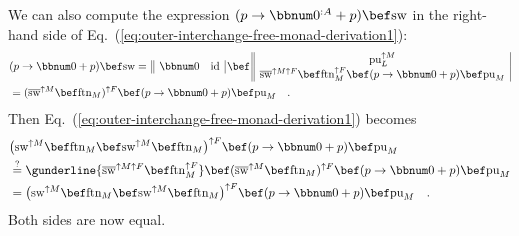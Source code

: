 We can also compute the expression $(p\rightarrow\bbnum 0^{:A}+p)\bef\text{sw}$
in the right-hand side of Eq.~(\ref{eq:outer-interchange-free-monad-derivation1}):
\begin{align*}
 & (p\rightarrow\bbnum 0+p)\bef\text{sw}=\,\begin{array}{||cc|}
\bbnum 0 & \text{id}\end{array}\,\bef\,\begin{array}{||c|}
\text{pu}_{L}^{\uparrow M}\\
\overline{\text{sw}}^{\uparrow M\uparrow F}\bef\text{ftn}_{M}^{\uparrow F}\bef(p\rightarrow\bbnum 0+p)\bef\text{pu}_{M}
\end{array}\\
 & =(\overline{\text{sw}}^{\uparrow M}\bef\text{ftn}_{M})^{\uparrow F}\bef(p\rightarrow\bbnum 0+p)\bef\text{pu}_{M}\quad.
\end{align*}
Then Eq.~(\ref{eq:outer-interchange-free-monad-derivation1}) becomes
\begin{align*}
 & \big(\text{sw}^{\uparrow M}\bef\text{ftn}_{M}\bef\text{sw}^{\uparrow M}\bef\text{ftn}_{M}\big)^{\uparrow F}\bef(p\rightarrow\bbnum 0+p)\bef\text{pu}_{M}\\
 & \overset{?}{=}\gunderline{\overline{\text{sw}}^{\uparrow M\uparrow F}\bef\text{ftn}_{M}^{\uparrow F}}\bef(\overline{\text{sw}}^{\uparrow M}\bef\text{ftn}_{M})^{\uparrow F}\bef(p\rightarrow\bbnum 0+p)\bef\text{pu}_{M}\\
 & =\big(\text{sw}^{\uparrow M}\bef\text{ftn}_{M}\bef\text{sw}^{\uparrow M}\bef\text{ftn}_{M}\big)^{\uparrow F}\bef(p\rightarrow\bbnum 0+p)\bef\text{pu}_{M}\quad.
\end{align*}
Both sides are now equal.

